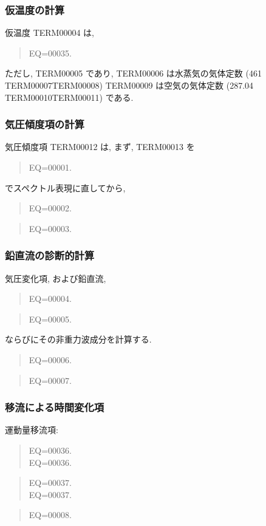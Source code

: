 \subsubsection{仮温度の計算}

仮温度 TERM00004 は, 
\begin{quote}
EQ=00035.
\end{quote}
ただし, TERM00005 であり, 
TERM00006 は水蒸気の気体定数
(461 TERM00007TERM00008)
TERM00009 は空気の気体定数
(287.04 TERM00010TERM00011)
である.

\subsubsection{気圧傾度項の計算}

気圧傾度項 TERM00012 は,
まず, TERM00013 を
\begin{quote}
EQ=00001.
\end{quote}
でスペクトル表現に直してから,
\begin{quote}
EQ=00002.
\end{quote}
\begin{quote}
EQ=00003.
\end{quote}

\subsubsection{鉛直流の診断的計算}

気圧変化項, および鉛直流,
\begin{quote}
EQ=00004.
\end{quote}
%
\begin{quote}
EQ=00005.
\end{quote}
%
ならびにその非重力波成分を計算する.
%
\begin{quote}
EQ=00006.
\end{quote}
%
\begin{quote}
EQ=00007.
\end{quote}

\subsubsection{移流による時間変化項}

運動量移流項:
\begin{quote}
\nonumber
EQ=00036.\\
EQ=00036.
\end{quote}
%
\begin{quote}
\nonumber
EQ=00037.\\
EQ=00037.
\end{quote}
\begin{quote}
EQ=00008.
\end{quote}

